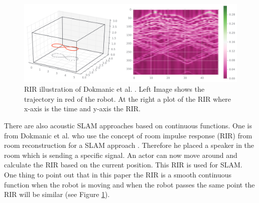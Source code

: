 \begin{figure}[h!]
	\centering
	\includegraphics[width=\textwidth]{images/acoustic_slam.png}
	\caption{
		RIR illustration of Dokmanic et al. \cite{dokmanic_roomrecslam_2016}. Left Image shows the trajectory in red of the robot. At the right a plot of the RIR where x-axis is the time and y-axis the RIR.
	}
	\label{fig:dokmanic_roomrecslam}
\end{figure}

There are also acoustic SLAM approaches based on continuous functions. One is from Dokmanic et al. who use the concept of room impulse response (RIR) from room reconstruction for a SLAM approach \cite{dokmanic_roomrecslam_2016}. Therefore he placed a speaker in the room which is sending a specific signal. An actor can now move around and calculate the RIR based on the current position. This RIR is used for SLAM. One thing to point out that in this paper the RIR is a smooth continuous function when the robot is moving and when the robot passes the same point the RIR will be similar (see Figure \ref{fig:dokmanic_roomrecslam}).
